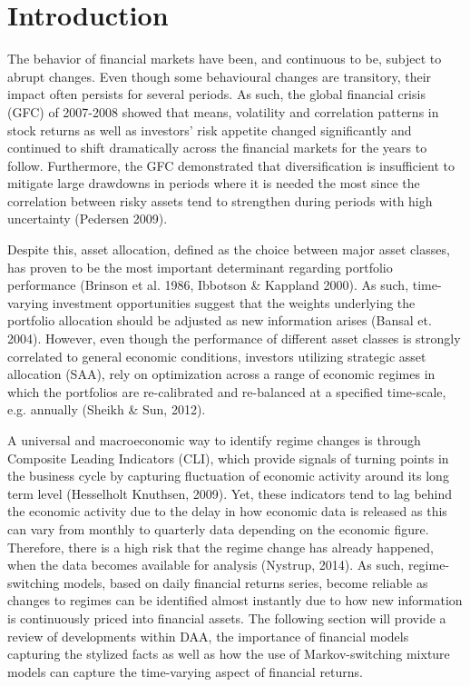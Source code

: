 \section{Introduction}
The behavior of financial markets have been, and continuous to be, subject to abrupt changes. Even though some behavioural changes are transitory, their impact often persists for several periods. As such, the global financial crisis (GFC) of 2007-2008 showed that means, volatility and correlation patterns in stock returns as well as investors' risk appetite changed significantly and continued to shift dramatically across the financial markets for the years to follow. Furthermore, the GFC demonstrated that diversification is insufficient to mitigate large drawdowns in periods where it is needed the most since the correlation between risky assets tend to strengthen during periods with high uncertainty (Pedersen 2009). 

Despite this, asset allocation, defined as the choice between major asset classes, has proven to be the most important determinant regarding portfolio performance (Brinson et al. 1986, Ibbotson \& Kappland 2000). As such, time-varying investment opportunities suggest that the weights underlying the portfolio allocation should be adjusted as new information arises (Bansal et. 2004). However, even though the performance of different asset classes is strongly correlated to general economic conditions, investors utilizing strategic asset allocation (SAA), rely on optimization across a range of economic regimes in which the portfolios are re-calibrated and re-balanced at a specified time-scale, e.g. annually (Sheikh \& Sun, 2012).

A universal and macroeconomic way to identify regime changes is through Composite Leading Indicators (CLI), which provide signals of turning points in the business cycle by capturing fluctuation of economic activity around its long term level (Hesselholt Knuthsen, 2009). Yet, these indicators tend to lag behind the economic activity due to the delay in how economic data is released as this can vary from monthly to quarterly data depending on the economic figure. Therefore, there is a high risk that the regime change has already happened, when the data becomes available for analysis (Nystrup, 2014). As such, regime-switching models, based on daily financial returns series, become reliable as changes to regimes can be identified almost instantly due to how new information is continuously priced into financial assets. The following section will provide a review of developments within DAA, the importance of financial models capturing the stylized facts as well as how the use of Markov-switching mixture models can capture the time-varying aspect of financial returns. 

